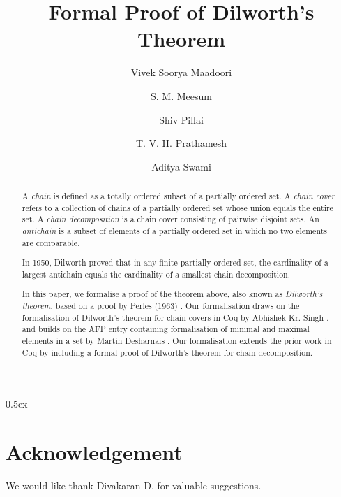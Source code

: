 \documentclass[11pt,a4paper]{article}
\begin{document}
\title{Formal Proof of Dilworth's Theorem}
\author{Vivek Soorya Maadoori \and S. M. Meesum \and Shiv Pillai \and T. V. H. Prathamesh \and Aditya Swami}

\maketitle

\begin{abstract}
A \emph{chain} is defined as a totally ordered subset of a partially ordered set. A \emph{chain cover} refers to 
a collection of chains of a partially ordered set whose union equals the entire set. A \emph{chain 
decomposition} is a chain cover consisting of pairwise disjoint sets. An \emph{antichain} is a subset of
 elements of a partially ordered set in which no two elements are comparable.

In 1950, Dilworth proved that in any finite partially ordered set, the cardinality of a  largest antichain equals the cardinality of a smallest chain decomposition.\cite{dilworth1950}


In this paper, we formalise a proof of the theorem above, also known as \emph{Dilworth's theorem}, based 
on a proof by Perles (1963) \cite{perles1963proof}. Our formalisation draws on the formalisation of Dilworth's theorem 
for chain covers in Coq by Abhishek Kr. Singh \cite{singh2017fully}, and builds on the AFP entry containing formalisation of minimal and maximal elements in a set by Martin Desharnais \cite{Min_Max_Least_Greatest-AFP}. Our formalisation extends the prior work in Coq by including a formal proof of  Dilworth's theorem for chain decomposition.
\end{abstract}

\tableofcontents

\parindent 0pt\parskip 0.5ex



\section*{Acknowledgement}
We would like thank Divakaran D. for valuable suggestions.



\end{document}
